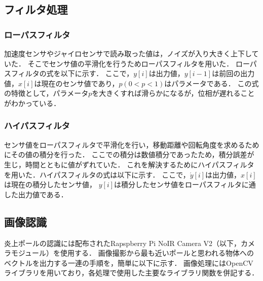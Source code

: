 \documentclass[11pt,a4]{jsarticle}
\begin{document}
  \subsection{フィルタ処理}
    \subsubsection{ローパスフィルタ}
      加速度センサやジャイロセンサで読み取った値は，ノイズが入り大きく上下していた．
      そこでセンサ値の平滑化を行うためローパスフィルタを用いた．
      ローパスフィルタの式を以下に示す．
      ここで，$y[i]$は出力値，$y[i-1]$は前回の出力値，$x[i]$は現在のセンサ値であり，$p(0<p<1)$はパラメータである．
      この式の特徴として，パラメータ$p$を大きくすれば滑らかになるが，位相が遅れることがわかっている．

    \subsubsection{ハイパスフィルタ}
      センサ値をローパスフィルタで平滑化を行い，移動距離や回転角度を求めるためにその値の積分を行った．
      ここでの積分は数値積分であったため，積分誤差が生じ，時間とともに値がずれていた．
      これを解決するためにハイパスフィルタを用いた．ハイパスフィルタの式は以下に示す．
      ここで，$\acute{y}[i]$は出力値，$x[i]$は現在の積分したセンサ値，
      $y[i]$は積分したセンサ値をローパスフィルタに通した出力値である．

  \subsection{画像認識}
    炎上ポールの認識には配布されたRapspberry Pi NoIR Camera V2（以下，カメラモジュール）を使用する．
    画像撮影から最も近いポールと思われる物体へのベクトルを出力する一連の手順を，簡単に以下に示す．
    画像処理にはOpenCVライブラリを用いており，各処理で使用した主要なライブラリ関数を併記する．
\end{document}
